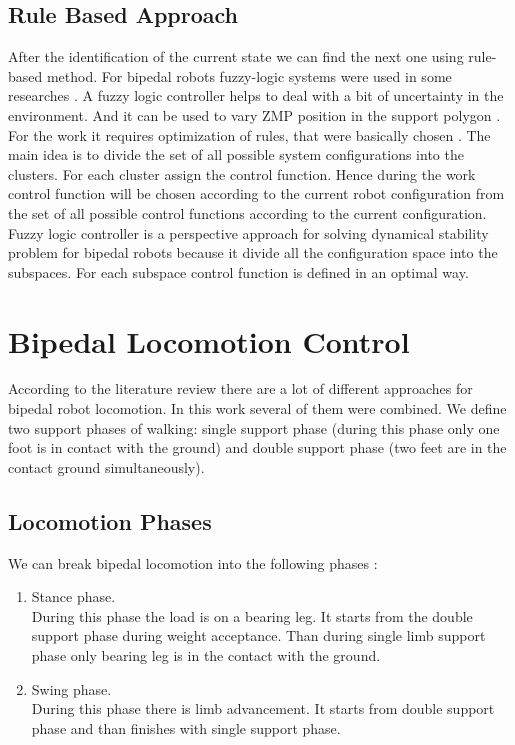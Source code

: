 \documentclass[12pt,a4paper]{report}
\begin{document}
		\section{Rule Based Approach}
			After the identification of the current state we can find the next one using rule-based method. For bipedal robots fuzzy-logic systems were used in some researches \cite{park2003fuzzy}.  A fuzzy logic controller helps to deal with a bit of uncertainty in the environment. And it can be used to vary ZMP position in the support polygon \cite{park2003fuzzy}. For the work it requires optimization of rules, that were basically chosen \cite{vundavilli2010dynamically}.
			The main idea is to divide the set of all possible system configurations into the clusters. For each cluster assign the control function. Hence during the work control function will be chosen according to the current robot configuration from the set of all possible control functions according to the current configuration.
			Fuzzy logic controller is a  perspective approach for solving dynamical stability problem for bipedal robots because it divide all the configuration space into the subspaces. For each subspace control function is  defined in an optimal way.
		
	\chapter{Bipedal Locomotion Control}
		According to the literature review there are a lot of different approaches for bipedal robot locomotion. In this work several of them were combined.
		We define two support phases of walking: single support phase (during this phase only one foot is in contact with the ground) and double support phase (two feet are in the contact ground simultaneously).
		
		\section{Locomotion Phases}
			We can break bipedal locomotion into the following phases \cite{rostami1998impactless}:
			
			\begin{enumerate}
				\item Stance phase.\\
					During this phase the load is on a bearing leg. It starts from the double support phase during weight acceptance. Than during single limb support phase only bearing leg is in the contact with the ground.
				\item Swing phase.\\
					During this phase there is limb advancement. It starts from double support phase and than finishes with single support phase.
			\end{enumerate}
			
\end{document}
